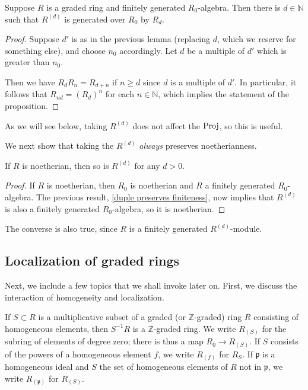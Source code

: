 \begin{proposition} 
Suppose $R$ is a graded ring and finitely generated $R_0$-algebra. Then there
is $d \in \mathbb{N}$ such that $R^{(d)}$ is generated over $R_0$ by $R_d$.
\end{proposition} 
\begin{proof} 
Suppose $d'$ is as in the previous lemma (replacing $d$, which we reserve for
something else), and choose $n_0$ accordingly. Let $d$ be a multiple of $d'$
which is greater than $n_0$.

Then we have $R_d R_n = R_{d+n}$ if $n \geq d$ since $d$ is a multiple of $d'$.
In particular, it follows that $R_{nd} = (R_d)^n$ for each $n \in \mathbb{N}$,
which implies the statement of the proposition.
\end{proof} 

As we will see below, taking $R^{(d)}$ does not affect the $\operatorname{Proj}$, so this is
useful.

We next show that taking the $R^{(d)}$ \emph{always} preserves noetherianness.

\begin{proposition} \label{filtnoetherian}
If $R$ is noetherian, then so is $R^{(d)}$ for any $d>0$.
\end{proposition} 
\begin{proof} 
If $R$ is noetherian, then $R_0$ is noetherian and $R$ a finitely generated
$R_0$-algebra. The previous result, \cref{duple preserves
finiteness},  now implies that $R^{(d)} $ is also a
finitely generated $R_0$-algebra, so it is noetherian.
\end{proof} 

The converse is also true, since $R$ is a finitely generated $R^{(d)}$-module.

\subsection{Localization of graded rings}
Next, we include a few topics that we shall invoke later on. 
First, we discuss the interaction of homogeneity and localization.

If $S \subset R$ is a multiplicative subset of a graded (or
$\mathbb{Z}$-graded) ring $R$ consisting of homogeneous elements, then $S^{-1}
R$ is a $\mathbb{Z}$-graded ring.  We write $R_{(S)}$ for the subring of
elements of degree zero; there is thus a map $R_0 \to R_{(S)}$.
If $S$ consists of the powers of a homogeneous element $f$, we write $R_{(f)}$
for $R_S$. If $\mathfrak{p}$ is a homogeneous ideal and $S$ the set of
homogeneous elements of $R$ not in $\mathfrak{p}$, we write
$R_{(\mathfrak{p})}$ for $R_{(S)}$.

